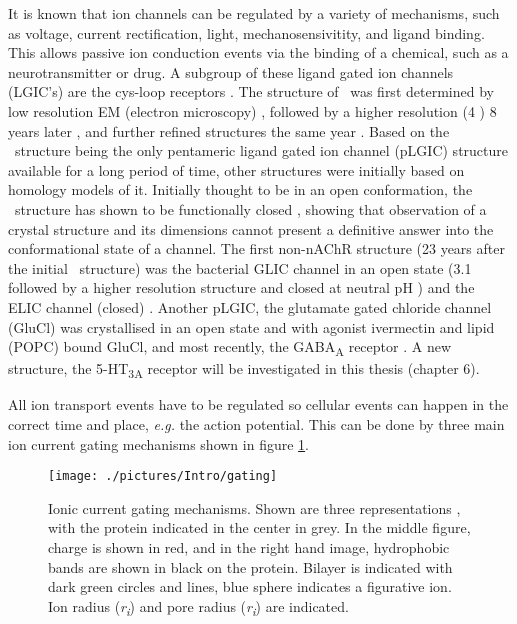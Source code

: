 It is known that ion channels can be regulated by a variety of mechanisms, such as voltage, current rectification, light, mechanosensivitity, and ligand binding. This allows passive ion conduction events via the binding of a chemical, such as a neurotransmitter or drug. A subgroup of these ligand gated ion channels (LGIC's) are the cys-loop receptors \cite{Connolly2004,Lester2004a}. The structure of \na\ was first determined by low resolution EM (electron microscopy) \cite{Unwin1995a}, followed by a higher resolution (4 \angstrom)  8 years later \cite{Miyazawa2003}, and further refined structures the same year \cite{Unwin2005}. Based on the \na\ structure being the only pentameric ligand gated ion channel (pLGIC) structure available for a long period of time, other structures were initially based on homology models of it. Initially thought to be in an open conformation, the \na\ structure has shown to be functionally closed \cite{Beckstein2003}, showing that observation of a crystal structure and its dimensions cannot present a definitive answer into the conformational state of a channel. The first non-nAChR structure (23 years after the initial \na\ structure) was the bacterial GLIC channel in an open state (3.1 \angstrom\, followed by a higher resolution structure \cite{Bocquet2009a} and closed at neutral pH \cite{Hilf2009}) and the ELIC channel (closed) \cite{Hilf2008}. Another pLGIC, the glutamate gated chloride channel (GluCl) was crystallised in an open state and with agonist ivermectin \cite{Hibbs2011} and lipid (POPC) bound GluCl, \cite{Althoff2014} and most recently, the GABA\textsubscript{A} receptor \cite{Miller2014b}.
A new structure, the 5-HT\textsubscript{3A} receptor will be investigated in this thesis (chapter 6).

All ion transport events have to be regulated so cellular events can happen in the correct time and place, \textit{e.g.} the action potential. This can be done by three main ion current gating mechanisms shown in figure \ref{fig:gating}. 

\begin{figure}[H]
\begin{center}
\texttt{[image: ./pictures/Intro/gating]}
\caption[Ionic current gating mechanisms.] {Ionic current gating mechanisms. Shown are three representations , with the protein indicated in the center in grey. In the middle figure, charge is shown in red, and in the right hand image, hydrophobic bands are shown in black on the protein.  Bilayer is indicated with dark green circles and lines, blue sphere indicates a figurative ion. Ion radius (\textit{r\textsubscript{i}}) and pore radius (\textit{r\textsubscript{i}}) are indicated.}
\label{fig:gating}
\end{center}
\end{figure}



